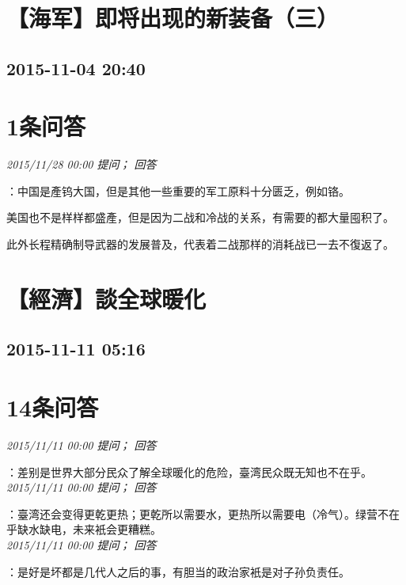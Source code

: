 \documentclass[twocolumn]{ctexart}
\begin{document}
\section{【海军】即将出现的新装备（三）}
\subsection{2015-11-04 20:40}


\section{1条问答}

\textit{\hfill\noindent\small 2015/11/28 00:00 提问； 回答}

：中国是產钨大国，但是其他一些重要的军工原料十分匮乏，例如铬。

美国也不是样样都盛產，但是因为二战和冷战的关系，有需要的都大量囤积了。

此外长程精确制导武器的发展普及，代表着二战那样的消耗战已一去不復返了。\\


\section{【經濟】談全球暖化}
\subsection{2015-11-11 05:16}


\section{14条问答}

\textit{\hfill\noindent\small 2015/11/11 00:00 提问； 回答}

：差别是世界大部分民众了解全球暖化的危险，臺湾民众既无知也不在乎。\\

\textit{\hfill\noindent\small 2015/11/11 00:00 提问； 回答}

：臺湾还会变得更乾更热；更乾所以需要水，更热所以需要电（冷气）。绿营不在乎缺水缺电，未来衹会更糟糕。\\

\textit{\hfill\noindent\small 2015/11/11 00:00 提问； 回答}

：是好是坏都是几代人之后的事，有胆当的政治家衹是对子孙负责任。\\
\end{document}
